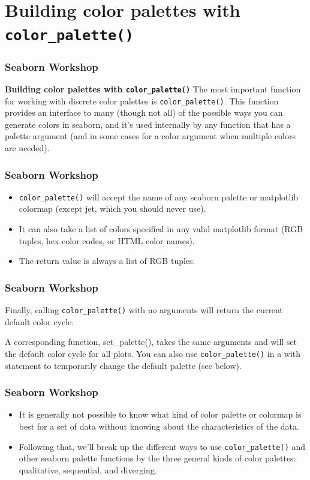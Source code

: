 \documentclass{beamer}
\begin{document}
\section{Building color palettes with \texttt{color\_palette()}}
\begin{frame}[fragile]
\frametitle{Seaborn Workshop}
\large

\textbf{Building color palettes with \texttt{color\_palette()}}
The most important function for working with discrete color palettes is \texttt{color\_palette()}. This function provides an interface to many (though not all) of the possible ways you can generate colors in seaborn, and it’s used internally by any function that has a palette argument (and in some cases for a color argument when multiple colors are needed).
\end{frame}
\begin{frame}[fragile]
	\frametitle{Seaborn Workshop}
	\large
	
\begin{itemize}
\item \texttt{color\_palette()} will accept the name of any seaborn palette or matplotlib colormap (except jet, which you should never use). 
\item It can also take a list of colors specified in any valid matplotlib format (RGB tuples, hex color codes, or HTML color names). \item The return value is always a list of RGB tuples.
\end{itemize}

\end{frame}
\begin{frame}[fragile]
\frametitle{Seaborn Workshop}
\large
Finally, calling \texttt{color\_palette()} with no arguments will return the current default color cycle.

A corresponding function, set\_palette(), takes the same arguments and will set the default color cycle for all plots. You can also use \texttt{color\_palette()} in a with statement to temporarily change the default palette (see below).
\end{frame}
\begin{frame}[fragile]
	\frametitle{Seaborn Workshop}
	\large
\begin{itemize}
\item It is generally not possible to know what kind of color palette or colormap is best for a set of data without knowing about the characteristics of the data.
\item Following that, we’ll break up the different ways to use \texttt{color\_palette()} and other seaborn palette functions by the three general kinds of color palettes: qualitative, sequential, and diverging.
\end{itemize}
\end{frame}
\end{document}
